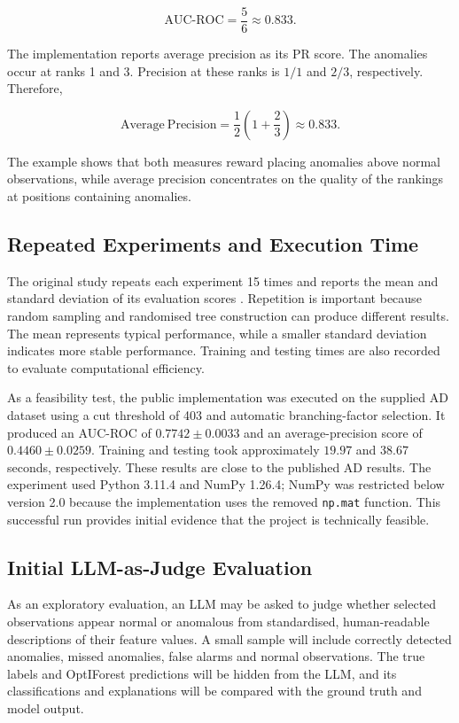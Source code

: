 \documentclass[11pt]{article}
\begin{document}
\[
\mathrm{AUC\mbox{-}ROC} = \frac{5}{6} \approx 0.833.
\]

The implementation reports average precision as its PR score. The
anomalies occur at ranks 1 and 3. Precision at these ranks is \(1/1\)
and \(2/3\), respectively. Therefore,

\[
\mathrm{Average\ Precision}
= \frac{1}{2}\left(1+\frac{2}{3}\right)
\approx 0.833.
\]

The example shows that both measures reward placing anomalies above
normal observations, while average precision concentrates on the quality
of the rankings at positions containing anomalies.

\subsection{Repeated Experiments and Execution Time}
The original study repeats each experiment 15 times and reports the mean
and standard deviation of its evaluation scores
\citep{xiang2023optiforest}. Repetition is important because random
sampling and randomised tree construction can produce different results.
The mean represents typical performance, while a smaller standard
deviation indicates more stable performance. Training and testing times
are also recorded to evaluate computational efficiency.

As a feasibility test, the public implementation was executed on the
supplied AD dataset using a cut threshold of 403 and automatic
branching-factor selection. It produced an AUC-ROC of
\(0.7742\pm0.0033\) and an average-precision score of
\(0.4460\pm0.0259\). Training and testing took approximately \(19.97\)
and \(38.67\) seconds, respectively. These results are close to the
published AD results. The experiment used Python 3.11.4 and NumPy
1.26.4; NumPy was restricted below version 2.0 because the implementation
uses the removed \texttt{np.mat} function. This successful run provides
initial evidence that the project is technically feasible.

\subsection{Initial LLM-as-Judge Evaluation}

As an exploratory evaluation, an LLM may be asked to judge whether
selected observations appear normal or anomalous from standardised,
human-readable descriptions of their feature values. A small sample will
include correctly detected anomalies, missed anomalies, false alarms and
normal observations. The true labels and OptIForest predictions will be
hidden from the LLM, and its classifications and explanations will be
compared with the ground truth and model output.
\end{document}
